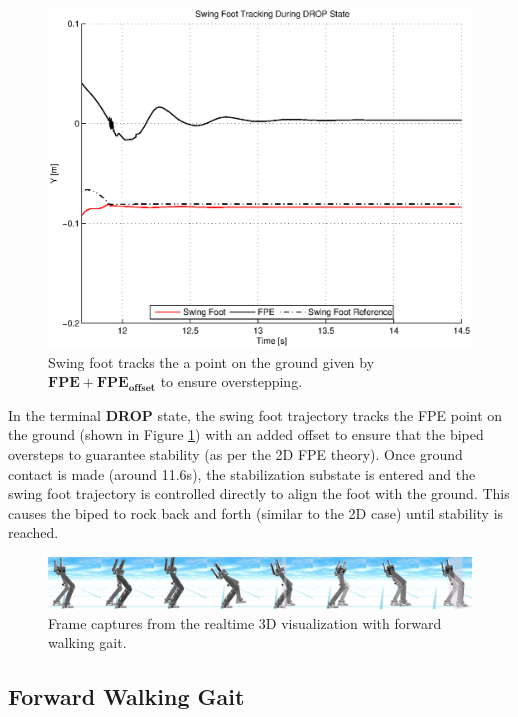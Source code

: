 \begin{figure}[!h]
	\centering
    \includegraphics[scale=0.7]{fig/simulations/sidefpetrack.eps}
  	\caption{Swing foot tracks the a point on the ground given by $\mathbf{FPE} + \mathbf{FPE_{offset}}$ to ensure overstepping.}
	\label{fig:sidefpetrack}
\end{figure}


In the terminal \textbf{DROP} state, the swing foot trajectory tracks the FPE point on the ground (shown in Figure \ref{fig:sidefpetrack}) with an added offset to ensure that the biped oversteps to guarantee stability (as per the 2D FPE theory). Once ground contact is made (around 11.6s), the stabilization substate is entered and the swing foot trajectory is controlled directly to align the foot with the ground. This causes the biped to rock back and forth (similar to the 2D case) until stability is reached.

\begin{figure}[!h]
	\centering
    \includegraphics[scale=0.1]{fig/simulations/fwdsequenceside.png}
  	\caption{Frame captures from the realtime 3D visualization with forward walking gait.}
	\label{fig:fwdsequenceside}
\end{figure}

\subsection{Forward Walking Gait} %
\label{sub:forward_walking_gait}

